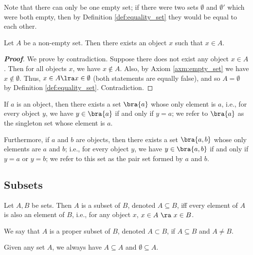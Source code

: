 \begin{remark}
Note that there can only be one empty set; if there were two sets $\emptyset$ and $\emptyset'$ which were both empty, then by Definition \ref{def:equality_set} they would be equal to each other.
\end{remark}

\begin{lemma}\label{lem:single_choice}
Let $A$ be a non-empty set. Then there exists an object $x$ such that $x\in A$.
\end{lemma}

\begin{proof}[\bf Proof]
We prove by contradiction. Suppose there does not exist any object $x\in A$. Then for all objects $x$, we have $x\notin A$. Also, by Axiom \ref{axm:empty_set} we have $x\notin \emptyset$. Thus, $x\in A \lra x\in \emptyset$ (both statements are equally false), and so $A = \emptyset$ by Definition \ref{def:equality_set}. Contradiction.
\end{proof}

\begin{axiom}
If $a$ is an object, then there exists a set $\bra{a}$ whose only element is $a$, i.e., for every object $y$, we have $y\in \bra{a}$ if and only if $y=a$; we refer to $\bra{a}$ as the singleton set whose element is $a$.

Furthermore, if $a$ and $b$ are objects, then there exists a set $\bra{a,b}$ whose only elements are $a$ and $b$; i.e., for every object $y$, we have $y \in \bra{a,b}$ if and only if $y=a$ or $y=b$; we refer to this set as the pair set formed by $a$ and $b$.
\end{axiom}

\subsection{Subsets}

\begin{definition}\label{def:subset}
Let $A,B$ be sets. Then $A$ is a subset of $B$, denoted $A\subseteq B$, iff every element of $A$ is also an element of $B$, i.e., for any object $x$, $x\in A\ \ra \ x\in B$.

We say that $A$ is a proper subset of $B$, denoted $A\subset B$, if $A\subseteq B$ and $A\neq B$.
\end{definition}

\begin{remark}
Given any set $A$, we always have $A\subseteq A$ and $\emptyset \subseteq A$.
\end{remark}

